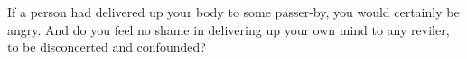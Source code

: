 If a person had delivered up your body to some passer-by, you would
certainly be angry. And do you feel no shame in delivering up your own
mind to any reviler, to be disconcerted and confounded?
